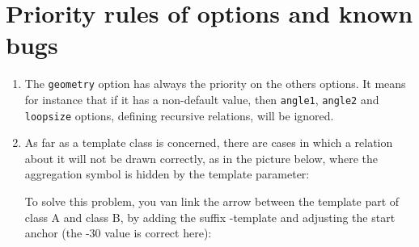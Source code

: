 \documentclass[a4paper,11pt]{report}
\begin{document}
\medskip

\begin{minipage}{0.5\textwidth}

\end{minipage}
\begin{minipage}{0.5\textwidth}
\begin{center}
\end{center}
\end{minipage}

\section{Priority rules of options and known bugs}\label{s.classbug}

\begin{enumerate}
\item The {\tt geometry} option has always the priority on the others options. It means for instance that if it has a non-default value, then {\tt angle1}, {\tt angle2} and {\tt loopsize} options, defining recursive relations, will be ignored.
\item As far as a template class is concerned, there are cases in which a relation about it will not be drawn correctly, as in the picture below, where the aggregation symbol is hidden by the template parameter:

\begin{minipage}{0.6\textwidth}

\end{minipage}
\begin{minipage}{0.4\textwidth}
\begin{center}
\end{center}
\end{minipage}

\medskip

To solve this problem,  you van link the arrow between the template part of class A and class B, by adding the suffix -template and adjusting the start anchor (the -30 value is correct here):

\medskip

\begin{minipage}{0.6\textwidth}

\end{minipage}
\begin{minipage}{0.4\textwidth}
\begin{center}
\end{center}
\end{minipage}


\end{enumerate}
\end{document}
